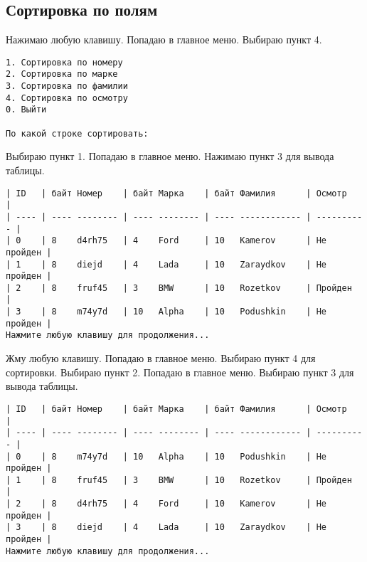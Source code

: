 \subsection{Сортировка по полям}

Нажимаю любую клавишу. Попадаю в главное меню. Выбираю пункт 4.

\begin{tcolorbox}
\begin{verbatim}
1. Сортировка по номеру
2. Сортировка по марке  
3. Сортировка по фамилии
4. Сортировка по осмотру
0. Выйти

По какой строке сортировать: 
\end{verbatim}
\end{tcolorbox}

Выбираю пункт 1. Попадаю в главное меню. Нажимаю пункт 3 для вывода таблицы.

\begin{tcolorbox}
\begin{verbatim}
| ID   | байт Номер    | байт Марка    | байт Фамилия      | Осмотр     |
| ---- | ---- -------- | ---- -------- | ---- ------------ | ---------- |
| 0    | 8    d4rh75   | 4    Ford     | 10   Kamerov      | Не пройден |
| 1    | 8    diejd    | 4    Lada     | 10   Zaraydkov    | Не пройден |
| 2    | 8    fruf45   | 3    BMW      | 10   Rozetkov     | Пройден    |
| 3    | 8    m74y7d   | 10   Alpha    | 10   Podushkin    | Не пройден |
Нажмите любую клавишу для продолжения...
\end{verbatim}
\end{tcolorbox}

Жму любую клавишу. Попадаю в главное меню. Выбираю пункт 4 для сортировки. Выбираю пункт 2. Попадаю в главное меню. Выбираю пункт 3 для вывода таблицы.

\begin{tcolorbox}
\begin{verbatim}
| ID   | байт Номер    | байт Марка    | байт Фамилия      | Осмотр     |
| ---- | ---- -------- | ---- -------- | ---- ------------ | ---------- |
| 0    | 8    m74y7d   | 10   Alpha    | 10   Podushkin    | Не пройден |
| 1    | 8    fruf45   | 3    BMW      | 10   Rozetkov     | Пройден    |
| 2    | 8    d4rh75   | 4    Ford     | 10   Kamerov      | Не пройден |
| 3    | 8    diejd    | 4    Lada     | 10   Zaraydkov    | Не пройден |
Нажмите любую клавишу для продолжения...
\end{verbatim}
\end{tcolorbox}

